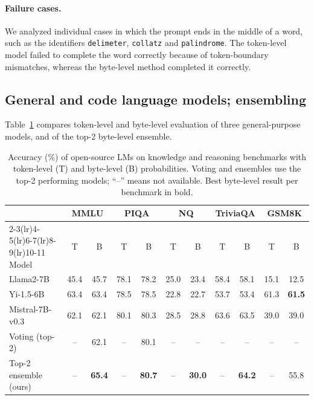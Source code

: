 \documentclass{article} %
\begin{document}
\paragraph{Failure cases.}
We analyzed individual cases in which the prompt ends in the middle of a word, such as the identifiers \texttt{delimeter}, \texttt{collatz} and \texttt{palindrome}. The token-level model failed to complete the word correctly because of token-boundary mismatches, whereas the byte-level method completed it correctly.

\subsection{General and code language models; ensembling}
Table~\ref{tab:general} compares token-level and byte-level evaluation of three general-purpose models, and of the top-2 byte-level ensemble.

\begin{table}[t]
\caption{Accuracy (\%) of open-source LMs on knowledge and reasoning benchmarks with token-level (T) and byte-level (B) probabilities. Voting and ensembles use the top-2 performing models; ``--'' means not available. Best byte-level result per benchmark in bold.}
\label{tab:general}
\begin{center}
\setlength{\tabcolsep}{3.5pt}
\small
\begin{tabular}{lcccccccccc}
\toprule
& \multicolumn{2}{c}{MMLU} & \multicolumn{2}{c}{PIQA} & \multicolumn{2}{c}{NQ} & \multicolumn{2}{c}{TriviaQA} & \multicolumn{2}{c}{GSM8K} \\
\cmidrule(lr){2-3}\cmidrule(lr){4-5}\cmidrule(lr){6-7}\cmidrule(lr){8-9}\cmidrule(lr){10-11}
Model & T & B & T & B & T & B & T & B & T & B \\
\midrule
Llama2-7B & 45.4 & 45.7 & 78.1 & 78.2 & 25.0 & 23.4 & 58.4 & 58.1 & 15.1 & 12.5 \\
Yi-1.5-6B & 63.4 & 63.4 & 78.5 & 78.5 & 22.8 & 22.7 & 53.7 & 53.4 & 61.3 & \textbf{61.5} \\
Mistral-7B-v0.3 & 62.1 & 62.1 & 80.1 & 80.3 & 28.5 & 28.8 & 63.6 & 63.5 & 39.0 & 39.0 \\
\midrule
Voting (top-2) & -- & 62.1 & -- & 80.1 & -- & -- & -- & -- & -- & -- \\
Top-2 ensemble (ours) & -- & \textbf{65.4} & -- & \textbf{80.7} & -- & \textbf{30.0} & -- & \textbf{64.2} & -- & 55.8 \\
\bottomrule
\end{tabular}
\end{center}
\end{table}
\end{document}
